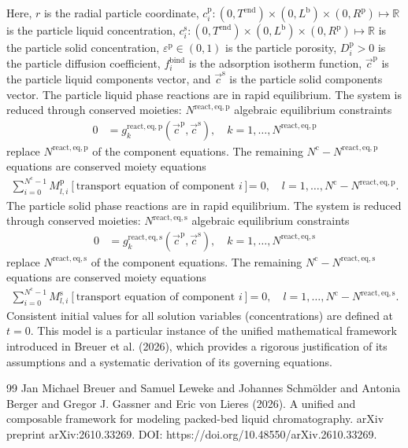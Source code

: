 \documentclass{article}
\begin{document}
Here, $r$ is the radial particle coordinate, $c^{\mathrm{p}}_{i}\colon (0, T^{\mathrm{end}}) \times (0, L^{\mathrm{b}})\times (0, R^{\mathrm{p}}) \mapsto \mathbb{R}$ is the particle liquid concentration, $c^{\mathrm{s}}_{i}\colon (0, T^{\mathrm{end}}) \times (0, L^{\mathrm{b}})\times (0, R^{\mathrm{p}}) \mapsto \mathbb{R}$ is the particle solid concentration, $\varepsilon^{\mathrm{p}}\in (0, 1)$ is the particle porosity, $D^{\mathrm{p}}_{i}> 0$ is the particle diffusion coefficient, $f^{\mathrm{bind}}_{i}$ is the adsorption isotherm function, $\vec{c}^{\mathrm{p}}$ is the particle liquid components vector, and $\vec{c}^{\mathrm{s}}$ is the particle solid components vector.
The particle liquid phase reactions are in rapid equilibrium.
The system is reduced through conserved moieties: $N^{\mathrm{react,eq},\mathrm{p}}$ algebraic equilibrium constraints
\begin{align}
    0
    &= g^{\mathrm{react,eq},\mathrm{p}}_{k}\left( \vec{c}^{\mathrm{p}}, \vec{c}^{\mathrm{s}} \right), \quad k = 1, \ldots, N^{\mathrm{react,eq},\mathrm{p}}
\end{align}
replace $N^{\mathrm{react,eq},\mathrm{p}}$ of the component equations.
The remaining $N^{\mathrm{c}} - N^{\mathrm{react,eq},\mathrm{p}}$ equations are conserved moiety equations
\begin{align}
    \sum_{i=0}^{N^{\mathrm{c}}-1} M^{\mathrm{p}}_{l,i} \left[ \text{transport equation of component } i \right]
    &= 0, \quad l = 1, \ldots, N^{\mathrm{c}} - N^{\mathrm{react,eq},\mathrm{p}}.
\end{align}
The particle solid phase reactions are in rapid equilibrium.
The system is reduced through conserved moieties: $N^{\mathrm{react,eq},\mathrm{s}}$ algebraic equilibrium constraints
\begin{align}
    0
    &= g^{\mathrm{react,eq},\mathrm{s}}_{k}\left( \vec{c}^{\mathrm{p}}, \vec{c}^{\mathrm{s}} \right), \quad k = 1, \ldots, N^{\mathrm{react,eq},\mathrm{s}}
\end{align}
replace $N^{\mathrm{react,eq},\mathrm{s}}$ of the component equations.
The remaining $N^{\mathrm{c}} - N^{\mathrm{react,eq},\mathrm{s}}$ equations are conserved moiety equations
\begin{align}
    \sum_{i=0}^{N^{\mathrm{c}}-1} M^{\mathrm{s}}_{l,i} \left[ \text{transport equation of component } i \right]
    &= 0, \quad l = 1, \ldots, N^{\mathrm{c}} - N^{\mathrm{react,eq},\mathrm{s}}.
\end{align}
Consistent initial values for all solution variables (concentrations) are defined at $t = 0$.
This model is a particular instance of the unified mathematical framework introduced in Breuer et al. (2026), which provides a rigorous justification of its assumptions and a systematic derivation of its governing equations.
\begin{thebibliography}{99}
     Jan Michael Breuer and Samuel Leweke and Johannes Schmölder and Antonia Berger and Gregor J. Gassner and Eric von Lieres (2026). A unified and composable framework for modeling packed-bed liquid chromatography. arXiv preprint arXiv:2610.33269. DOI: https://doi.org/10.48550/arXiv.2610.33269.
\end{thebibliography}
\end{document}
